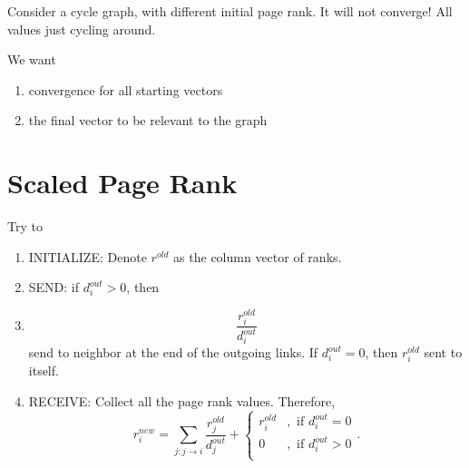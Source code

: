 \begin{eg}
	Consider a cycle graph, with different initial page rank. It will not converge! All values just cycling around.
\end{eg}

We want
\begin{enumerate}
	\item convergence for all starting vectors
	\item the final vector to be relevant to the graph
\end{enumerate}

\section{Scaled Page Rank}
\begin{intuition}
	Try to
\end{intuition}
\begin{enumerate}
	\item INITIALIZE: Denote \(r^{old}\) as the column vector of ranks.
	\item SEND: if \(d^{out}_i > 0\), then
	\item \[
		      \frac{r_{i}^{old}}{d_{i}^{out}}
	      \]send to neighbor at the end of the outgoing links. If \(d_{i}^{out} = 0\), then \(r_{i}^{old}\) sent to itself.
	\item RECEIVE: Collect all the page rank values. Therefore,
	      \[
		      r_{i}^{new} = \sum\limits_{j:j\to i}\frac{r_{j}^{old}}{d_{j}^{out}}+\begin{cases}
			      r_{i}^{old} & , \text{ if }d_{i}^{out} = 0 \\
			      0           & , \text{ if }d_{i}^{out} > 0 \\
		      \end{cases} .
	      \]
\end{enumerate}

